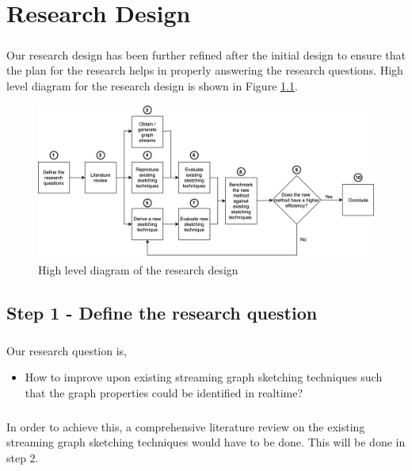 \chapter{Research Design}

\paragraph{}
Our research design has been further refined after the initial design to ensure that the plan for the research helps in properly answering the research questions. High level diagram for the research design is shown in Figure \ref{figure:des}.

\begin{figure}[H]
    \centering
    \includegraphics[width=\textwidth]{images/research-design}
    \caption{High level diagram of the research design}
    \label{figure:des}
\end{figure}

\section*{Step 1 - Define the research question}

\paragraph{}
Our research question is,

\begin{itemize}
    \item How to improve upon existing streaming graph sketching techniques such that the graph properties could be identified in realtime? 
\end{itemize}

\paragraph{}
In order to achieve this, a comprehensive literature review on the existing streaming graph sketching techniques would have to be done. This will be done in step 2. 

